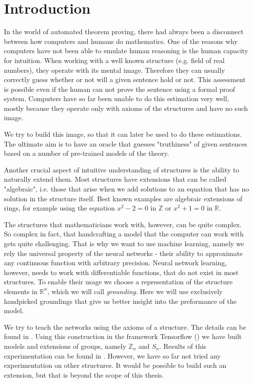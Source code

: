 \chapter*{Introduction}
\label{intro}

In the world of automated theorem proving, there had always been a disconnect between how computers and humans do mathematics. One of the reasons why computers have not been able to emulate human reasoning is the human capacity for intuition. When working with a well known structure (e.g. field of real numbers), they operate with its mental image. Therefore they can usually correctly guess whether or not will a given sentence hold or not. This assessment is possible even if the human can not prove the sentence using a formal proof system. Computers have so far been unable to do this estimation very well, mostly because they operate only with axioms of the structures and have no such image.

We try to build this image, so that it can later be used to do these estimations. The ultimate aim is to have an oracle that guesses "truthiness" of given sentences based on a number of pre-trained models of the theory. 

Another crucial aspect of intuitive understanding of structures is the ability to naturally extend them. Most structures have extensions that can be called "algebraic", i.e. those that arise when we add solutions to an equation that has no solution in the structure itself. Best known examples are algebraic extensions of rings, for example using the equation $x^2-2=0$ in $\mathbb{Z}$ or $x^2+1=0$ in $\mathbb{R}$.

The structures that mathematicians work with, however, can be quite complex. So complex in fact, that handcrafting a model that the computer can work with gets quite challenging. That is why we want to use machine learning, namely we rely the universal property of the neural networks - their ability to approximate any continuous function with arbitrary precision. Neural network learning, however, needs to work with differentiable functions, that do not exist in most structures. To enable their usage we choose a representation of the structure elements in $\mathbb{R}^n$, which we will call \textit{grounding}. Here we will use exclusively handpicked groundings that give us better insight into the preformance of the model.

We try to teach the networks using the axioms of a structure. The details can be found in . Using this construction in the framework Tensorflow (\cite{tf}) we have built models and extensions of groups, namely $\mathbb{Z}_n$ and $S_n$. Results of this experimentation can be found in . However, we have so far not tried any experimentation on other structures. It would be possible to build such an extension, but that is beyond the scope of this thesis. 